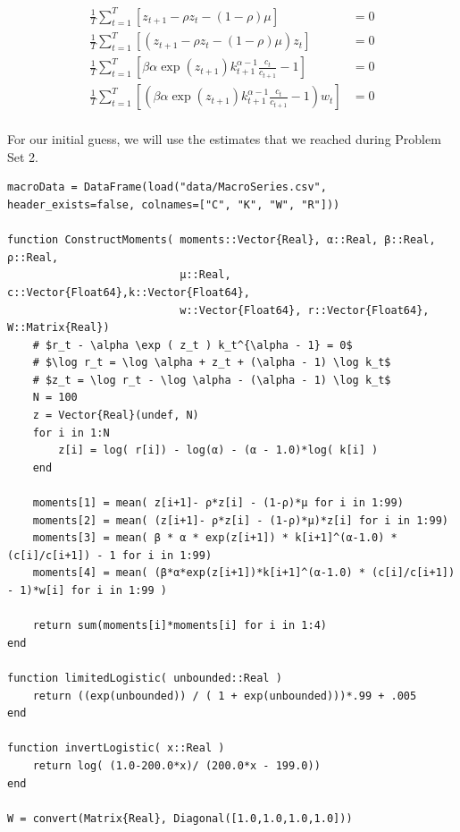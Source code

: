 \documentclass[12pt]{paper}
\newcommand{\brak}[1]{ \left [ #1 \right ] }
\begin{document}
\begin{align*}
  \frac{1}{T} \sum_{t=1}^T \brak{ z_{t+1} - \rho z_t - (1-\rho)\mu} &= 0\\
  \frac{1}{T} \sum_{t=1}^T \brak{ \left( z_{t+1} - \rho z_t - (1-\rho)\mu
  \right)z_t} &= 0\\
  \frac{1}{T} \sum_{t=1}^T \brak{ \beta \alpha \exp(z_{t+1}) k_{t+1}^{\alpha-1}
  \frac{c_t}{c_{t+1}} - 1} &= 0\\
  \frac{1}{T} \sum_{t=1}^T \brak{ \left( \beta \alpha \exp(z_{t+1}) k_{t+1}^{\alpha-1}
  \frac{c_t}{c_{t+1}} - 1 \right) w_t} &= 0\\  
\end{align*}

For our initial guess, we will use the estimates that we reached
during Problem Set 2.

\begin{verbatim}
macroData = DataFrame(load("data/MacroSeries.csv", header_exists=false, colnames=["C", "K", "W", "R"]))

function ConstructMoments( moments::Vector{Real}, α::Real, β::Real, ρ::Real,
                           μ::Real, c::Vector{Float64},k::Vector{Float64},
                           w::Vector{Float64}, r::Vector{Float64}, W::Matrix{Real})
    # $r_t - \alpha \exp ( z_t ) k_t^{\alpha - 1} = 0$
    # $\log r_t = \log \alpha + z_t + (\alpha - 1) \log k_t$
    # $z_t = \log r_t - \log \alpha - (\alpha - 1) \log k_t$
    N = 100
    z = Vector{Real}(undef, N)
    for i in 1:N
        z[i] = log( r[i]) - log(α) - (α - 1.0)*log( k[i] )
    end

    moments[1] = mean( z[i+1]- ρ*z[i] - (1-ρ)*μ for i in 1:99)
    moments[2] = mean( (z[i+1]- ρ*z[i] - (1-ρ)*μ)*z[i] for i in 1:99)
    moments[3] = mean( β * α * exp(z[i+1]) * k[i+1]^(α-1.0) * (c[i]/c[i+1]) - 1 for i in 1:99)
    moments[4] = mean( (β*α*exp(z[i+1])*k[i+1]^(α-1.0) * (c[i]/c[i+1]) - 1)*w[i] for i in 1:99 )

    return sum(moments[i]*moments[i] for i in 1:4)
end

function limitedLogistic( unbounded::Real )
    return ((exp(unbounded)) / ( 1 + exp(unbounded)))*.99 + .005
end

function invertLogistic( x::Real )
    return log( (1.0-200.0*x)/ (200.0*x - 199.0))
end

W = convert(Matrix{Real}, Diagonal([1.0,1.0,1.0,1.0]))


\end{verbatim}
\end{document}

